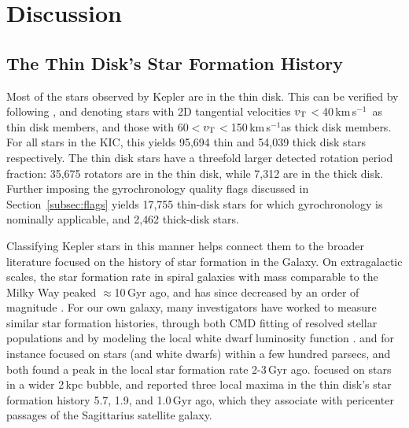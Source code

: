 \documentclass[11pt,twocolumn,tighten]{aastex63}
\newcommand{\kms}{{km\,s$^{-1}$}}
\begin{document}



\section{Discussion}
\label{sec:disc}

\subsection{The Thin Disk's Star Formation History}

Most of the stars observed by Kepler are in the thin disk.
This can be verified by following \citet{Gaia_2018}, and denoting stars with 2D tangential
velocities $v_{\rm T}$$<$40\,\kms\ as thin disk members, and those
with 60$<$$v_{\rm T}$$<$150\,\kms as thick disk members.  For all
stars in the KIC, this yields 95{,}694 thin and 54{,}039 thick disk stars respectively.  
The thin disk stars have a threefold larger detected rotation period
fraction: 35{,}675 rotators are in the thin disk, while 7{,}312 are in
the thick disk.  Further imposing the gyrochronology quality flags
discussed in Section~\ref{subsec:flags} yields 17{,}755
thin-disk stars for which gyrochronology is nominally applicable, and
2{,}462 thick-disk stars.

Classifying Kepler stars in this manner helps connect
them to the broader literature focused
on the history of star formation in the Galaxy.  On extragalactic
scales, the star formation rate in spiral galaxies with mass
comparable to the Milky Way peaked $\approx$10\,Gyr ago, and has since
decreased by an order of magnitude
\citep[e.g.][]{2004Natur.428..625H,2006ApJ...651..142H}.  For our own
galaxy, many investigators have worked to measure similar star
formation histories, through both CMD fitting of resolved stellar
populations
\citep[][]{2019A&A...624L...1M,2020NatAs...4..965R,2021MNRAS.501..302A,2022Natur.603..599X}
and by modeling the local white dwarf luminosity function
\citep[e.g.][]{2019ApJ...878L..11I}.  
\citet{2019A&A...624L...1M} and \citet{2019ApJ...878L..11I} for
instance focused on stars (and white dwarfs) within a few hundred
parsecs, and both found a peak in the local star
formation rate 2-3\,Gyr ago.  \citet{2020NatAs...4..965R} focused on
stars in a wider 2\,kpc bubble, and reported three local maxima
in the thin disk's star formation history 5.7, 1.9, and 1.0\,Gyr ago,
which they associate with pericenter passages of the Sagittarius satellite
galaxy.
\end{document}
